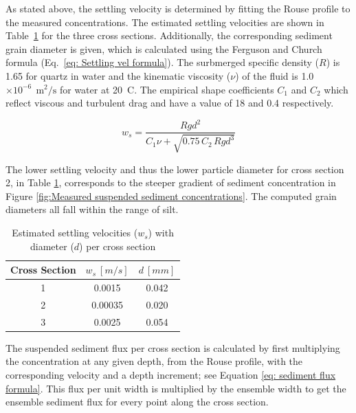 As stated above, the settling velocity is determined by fitting the Rouse profile to the measured concentrations. 
The estimated settling velocities are shown in Table~\ref{tab: Overview settling velocity} for the three cross sections. 
Additionally, the corresponding sediment grain diameter is given, which is calculated using the Ferguson and Church \autocite{fergusonSimpleUniversalEquation2004} formula (Eq.~\ref{eq: Settling vel formula}). The surbmerged specific density ($R$) is 1.65 for quartz in water and the kinematic viscosity ($\nu$) of the fluid is 1.0 $\times 10^{-6}~\ \text{m}^2\text{/s}$ for water at 20~\textdegree C. The empirical shape coefficients $C_1$ and $C_2$ which reflect viscous and turbulent drag and have a value of 18 and 0.4 respectively.

\begin{equation}
    w_s = \frac{R g d^2}{C_1 \nu + \sqrt{0.75\, C_2\, R g d^3}}
    \label{eq: Settling vel formula}
\end{equation}

The lower settling velocity and thus the lower particle diameter for cross section 2, in Table \ref{tab: Overview settling velocity}, corresponds to the steeper gradient of sediment concentration in Figure \ref{fig:Measured suspended sediment concentrations}. The computed grain diameters all fall within the range of silt.

\begin{table}[H]
    \centering
    \caption{Estimated settling velocities ($w_s$) with diameter ($d$) per cross section}
    \label{tab: Overview settling velocity}
    \setlength{\tabcolsep}{8pt}
    \begin{tabular}{c c c}
        \hline
        Cross Section & $w_s~[m/s]$ & $d~[mm]$  \\
        \hline
        1 & 0.0015 &  0.042 \\
        2 & 0.00035  &  0.020 \\
        3 & 0.0025 & 0.054 \\
        \hline
    \end{tabular}
\end{table}

The suspended sediment flux per cross section is calculated by first multiplying the concentration at any given depth, from the Rouse profile, with the corresponding velocity and a depth increment; see Equation \ref{eq: sediment flux formula}. This flux per unit width is multiplied by the ensemble width to get the ensemble sediment flux for every point along the cross section. 


